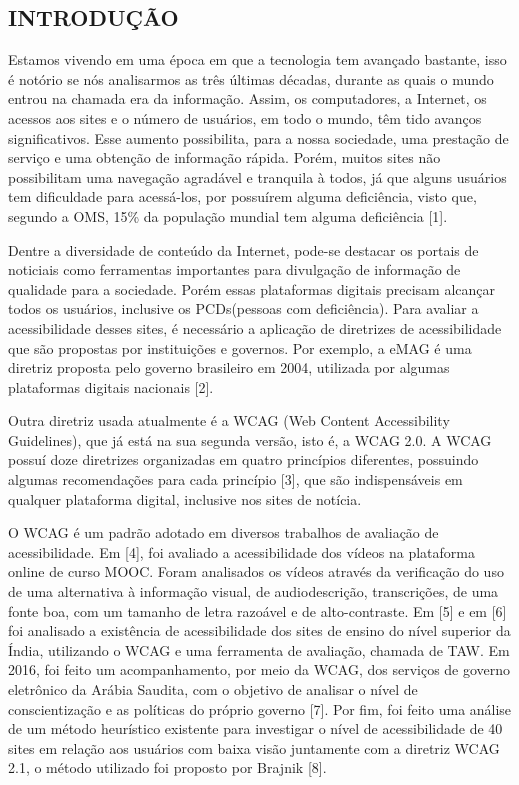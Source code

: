 \documentclass[a4paper]{article}
\begin{document}
\begin{titlepage}
	\begin{center}
		\tableofcontents
	\end{center}
\end{titlepage}
\begin{titlepage}
\section{INTRODUÇÃO}
\fontsize{12pt}{0pt}\selectfont
\onehalfspacing
Estamos vivendo em uma época em que a tecnologia tem avançado bastante, isso é notório se nós analisarmos as três últimas décadas, durante as quais o mundo entrou na chamada era da informação. Assim, os computadores, a Internet, os acessos aos sites e o número de usuários, em todo o mundo, têm tido avanços significativos. Esse aumento possibilita, para a nossa sociedade, uma prestação de serviço e uma obtenção de informação rápida. Porém, muitos sites não possibilitam uma navegação agradável e tranquila à todos, já que alguns usuários tem dificuldade para acessá-los, por possuírem alguma deficiência, visto que, segundo a OMS, 15\% da população mundial tem alguma deficiência [1].

Dentre a diversidade de conteúdo da Internet, pode-se destacar os portais de noticiais como ferramentas importantes para divulgação de informação de qualidade para a sociedade. Porém essas plataformas digitais precisam alcançar todos os usuários, inclusive os PCDs(pessoas com deficiência). Para avaliar a acessibilidade desses sites, é necessário a aplicação de diretrizes de acessibilidade que são propostas por instituições e governos. Por exemplo, a eMAG é uma diretriz proposta pelo governo brasileiro em 2004, utilizada por algumas plataformas digitais nacionais [2].

Outra diretriz usada atualmente é a WCAG (Web Content Accessibility Guidelines), que já está na sua segunda versão, isto é, a WCAG 2.0. A WCAG possuí doze diretrizes organizadas em quatro princípios diferentes, possuindo algumas recomendações para cada princípio [3], que são indispensáveis em qualquer plataforma digital, inclusive nos sites de notícia.

O WCAG é um padrão adotado em diversos trabalhos de avaliação de acessibilidade. Em [4], foi avaliado a acessibilidade dos vídeos na plataforma online de curso MOOC. Foram analisados os vídeos através da verificação do uso de uma alternativa à informação visual, de audiodescrição, transcrições, de uma fonte boa, com um tamanho de letra razoável e de alto-contraste. Em [5] e em [6] foi analisado a existência de acessibilidade dos sites de ensino do nível superior da Índia, utilizando o WCAG e uma ferramenta de avaliação, chamada de TAW. Em 2016, foi feito um acompanhamento, por meio da WCAG, dos serviços de governo eletrônico da Arábia Saudita, com o objetivo de analisar o nível de conscientização e as políticas do próprio governo [7]. Por fim, foi feito uma análise de um método heurístico existente para investigar o nível de acessibilidade de 40 sites em relação aos usuários com baixa visão juntamente com a diretriz WCAG 2.1, o método utilizado foi proposto por Brajnik [8].


\end{titlepage}
\end{document}
